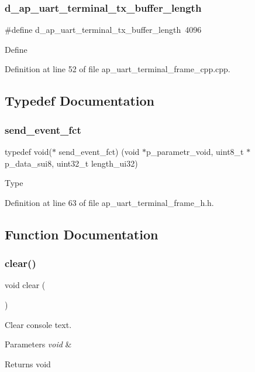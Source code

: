 \subsubsection{d\_ap\_uart\_terminal\_tx\_buffer\_length}
{\footnotesize\ttfamily \#define d\+\_\+ap\+\_\+uart\+\_\+terminal\+\_\+tx\+\_\+buffer\+\_\+length~4096}

Define 

Definition at line 52 of file ap\+\_\+uart\+\_\+terminal\+\_\+frame\+\_\+cpp.\+cpp.



\subsection{Typedef Documentation}
\mbox{\label{group___u_a_r_t__terminal_ga1d68ed9ea85b1c3bb5539abad6d7e4f1}} 
\subsubsection{send\_event\_fct}
{\footnotesize\ttfamily typedef void($\ast$ send\+\_\+event\+\_\+fct) (void $\ast$p\+\_\+parametr\+\_\+void, uint8\+\_\+t $\ast$p\+\_\+data\+\_\+sui8, uint32\+\_\+t length\+\_\+ui32)}

Type 

Definition at line 63 of file ap\+\_\+uart\+\_\+terminal\+\_\+frame\+\_\+h.\+h.



\subsection{Function Documentation}
\mbox{\label{group___u_a_r_t__terminal_gae683fe63c33c388e9ba1c6392dd477eb}} 
\subsubsection{clear()}
{\footnotesize\ttfamily void clear (\begin{DoxyParamCaption}\item[{void}]{ }\end{DoxyParamCaption})}



Clear console text. 


\begin{DoxyParams}{Parameters}
{\em void} & \\
\hline
\end{DoxyParams}
\begin{DoxyReturn}{Returns}
void 
\end{DoxyReturn}


